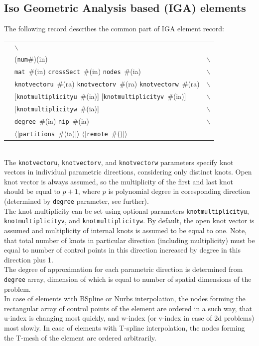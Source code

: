 \documentclass[a4paper]{article}
\makeatletter
\newcommand{\param}[1]{\texttt{#1}} %
\newcommand{\optional}[1]{[#1]} %
\newcommand{\field}[2]{\param{#1}~\#{\tiny(#2)}} %
\newcommand{\optField}[2]{\optional{\field{#1}{#2}}}
\newcommand{\componentNum}{(\param{num}\#){\tiny(in)}} %
\newcommand{\entKeyword}[1]{*\textbf{#1}} %
\renewcommand{\parallel}[1]{$\langle${#1}$\rangle$}
\newcommand{\PoptField      }[2]{\parallel{\optField{#1}{#2}}}
\newcounter{rcc}
\newenvironment{record}[1][\textwidth]{\setcounter{rcc}{0}\begin{tabular*}{#1}{|ll@{\extracolsep{\fill}}r}}{\end{tabular*}\\}
\newcommand{\recentry}[2]{\ifthenelse{\value{rcc}>0}{&$\backslash$ \\}{\setcounter{rcc}{1}}{#1}&{#2}}
\makeatother
\begin{document}
\clearpage

\subsection{Iso Geometric Analysis based (IGA) elements}
The following record describes the common part of IGA element record:
 
\noindent
\begin{record}
  \recentry{\entKeyword{IGAElement}}{\componentNum}
  \recentry{}{\field{mat}{in} \field{crossSect}{in} \field{nodes}{ia}}
  \recentry{}{\field{knotvectoru}{ra} \field{knotvectorv}{ra} \field{knotvectorw}{ra}}
  \recentry{}{\optField{knotmultiplicityu}{ia} \optField{knotmultiplicityv}{ia}}
  \recentry{}{\optField{knotmultiplicityw}{ia}}
  \recentry{}{\field{degree}{ia} \field{nip}{ia}}
  \recentry{}{\PoptField{partitions}{ia} \PoptField{remote}{}}
\end{record}
The \param{knotvectoru}, \param{knotvectorv}, and \param{knotvectorw} parameters specify  knot vectors in individual parametric directions, considering only distinct knots. Open knot vector is always assumed, so the multiplicity of the first and last knot should be equal to $p+1$, where $p$ is polynomial degree in coresponding direction (determined by \param{degree} parameter, see further).\\
The knot multiplicity can be set using optional parameters \param{knotmultiplicityu}, \param{knotmultiplicityv}, and \param{knotmultiplicityw}. By default, the open knot vector is assumed and multiplicity of internal knots is assumed to be equal to one. Note, that total number of knots in particular direction (including multiplicity) must be equal to number of control points in this direction increased by degree in this direction plus 1.\\
The degree of approximation for each parametric direction is determined from \param{degree} array, dimension of which is equal to number of spatial dimensions of the problem.\\
In case of elements with BSpline or Nurbs interpolation, the nodes forming the rectangular array of control points of the element are ordered in a such way, that u-index is changing most quickly, and w-index (or v-index in case of 2d problems) most slowly. In case of elements with T-spline interpolation, the nodes forming the T-mesh of the element are ordered arbitrarily.
\end{document}
